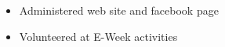 \small
\begin{itemize}
    \item Administered web site and facebook page
    \item Volunteered at E-Week activities
\end{itemize}
\normalsize
